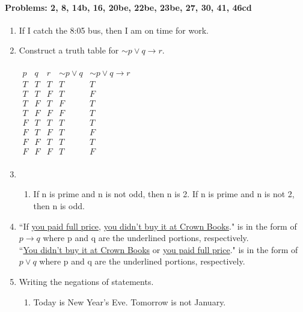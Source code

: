 \documentclass{article}
\makeatletter
\newcommand\setItemnumber[1]{\setcounter{enum\romannumeral\@enumdepth}{\numexpr#1-1\relax}}
\makeatother
\begin{document}
\paragraph{Problems: 2, 8, 14b, 16, 20be, 22be, 23be, 27, 30, 41, 46cd}
\begin{enumerate}
    \setItemnumber{2}
    \item If I catch the 8:05 bus, then I am on time for work.
    \setItemnumber{8}
    \item Construct a truth table for $\sim p \lor q \rightarrow r$.\\
    \\
    \begin{math} 
  \begin{array}{|ccc|c|c|}
    p&q&r& \sim p \lor q & \sim p \lor q \rightarrow r \\
    \hline
    T&T&T &T &T \\
    T&T&F &T &F\\
    T&F&T &F &T\\
    T&F&F &F &T\\
    F&T&T &T &T\\
    F&T&F &T &F\\
    F&F&T &T &T\\
    F&F&F &T &F\\
  \end{array}
  \end{math}
  \\
  \setItemnumber{14}
  \item 
  \begin{enumerate}
      \setItemnumber{2}
      \item If n is prime and n is not odd, then n is 2. If n is prime and n is not 2, then n is odd.
  \end{enumerate}
  \setItemnumber{16}
  \item ``If \underline{you paid full price}, \underline{you didn’t buy it at Crown Books}." is in the form of $p \rightarrow q$ where p and q are the underlined portions, respectively. \\
  ``\underline{You didn’t buy it at Crown Books} or \underline{you paid full price}." is in the form of $p \lor q$ where p and q are the underlined portions, respectively.
  \setItemnumber{20}
  \item Writing the negations of statements.
  \begin{enumerate}
      \setItemnumber{2}
      \item Today is New Year's Eve. Tomorrow is not January.
      \setItemnumber{5}

\end{enumerate}
\end{enumerate}
\end{document}
